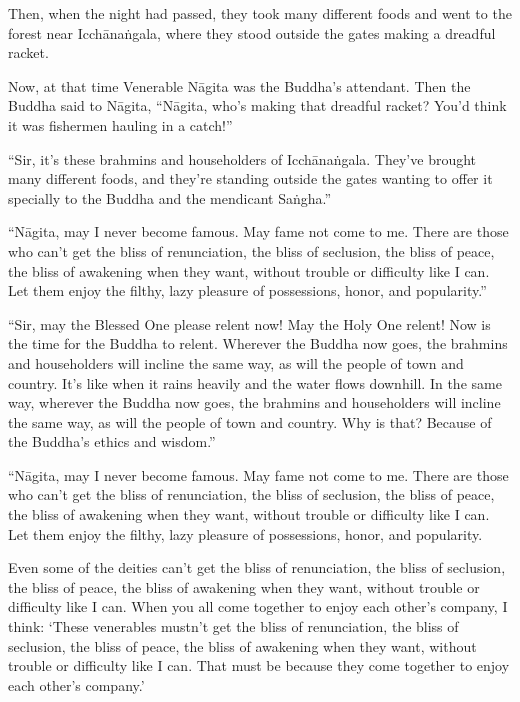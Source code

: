 \documentclass[12pt,openany]{book}%
\begin{document}
Then, when the night had passed, they took many different foods and went to the forest near \textsanskrit{Icchānaṅgala}, where they stood outside the gates making a dreadful racket. 

Now, at that time Venerable \textsanskrit{Nāgita} was the Buddha’s attendant. Then the Buddha said to \textsanskrit{Nāgita}, “\textsanskrit{Nāgita}, who’s making that dreadful racket? You’d think it was fishermen hauling in a catch!” 

“Sir, it’s these brahmins and householders of \textsanskrit{Icchānaṅgala}. They’ve brought many different foods, and they’re standing outside the gates wanting to offer it specially to the Buddha and the mendicant \textsanskrit{Saṅgha}.” 

“\textsanskrit{Nāgita}, may I never become famous. May fame not come to me. There are those who can’t get the bliss of renunciation, the bliss of seclusion, the bliss of peace, the bliss of awakening when they want, without trouble or difficulty like I can. Let them enjoy the filthy, lazy pleasure of possessions, honor, and popularity.” 

“Sir, may the Blessed One please relent now! May the Holy One relent! Now is the time for the Buddha to relent. Wherever the Buddha now goes, the brahmins and householders will incline the same way, as will the people of town and country. It’s like when it rains heavily and the water flows downhill. In the same way, wherever the Buddha now goes, the brahmins and householders will incline the same way, as will the people of town and country. Why is that? Because of the Buddha’s ethics and wisdom.” 

“\textsanskrit{Nāgita}, may I never become famous. May fame not come to me. There are those who can’t get the bliss of renunciation, the bliss of seclusion, the bliss of peace, the bliss of awakening when they want, without trouble or difficulty like I can. Let them enjoy the filthy, lazy pleasure of possessions, honor, and popularity. 

Even some of the deities can’t get the bliss of renunciation, the bliss of seclusion, the bliss of peace, the bliss of awakening when they want, without trouble or difficulty like I can. When you all come together to enjoy each other’s company, I think: ‘These venerables mustn’t get the bliss of renunciation, the bliss of seclusion, the bliss of peace, the bliss of awakening when they want, without trouble or difficulty like I can. That must be because they come together to enjoy each other’s company.’ 
\end{document}
